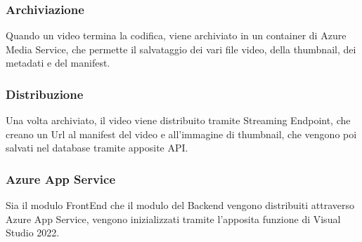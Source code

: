 \subsubsection{Archiviazione}
Quando un video termina la codifica, viene archiviato in un container di Azure Media Service, che permette il salvataggio dei vari file video, della thumbnail, dei metadati e del manifest.\\
\subsubsection{Distribuzione}
Una volta archiviato, il video viene distribuito tramite Streaming Endpoint, che creano un Url al manifest del video e all'immagine di thumbnail, che vengono poi salvati nel database tramite apposite API.\\
\subsubsection{Azure App Service}
Sia il modulo FrontEnd che il modulo del Backend vengono distribuiti attraverso Azure App Service, vengono inizializzati tramite l'apposita funzione di Visual Studio 2022.\\ 